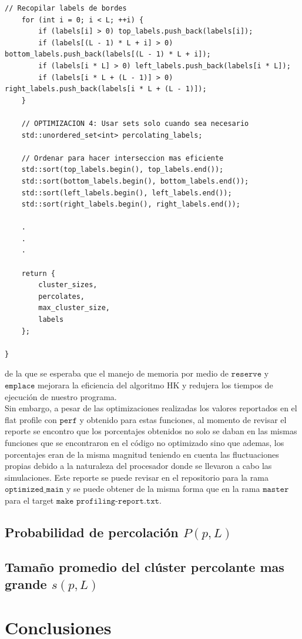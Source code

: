 \documentclass[12pt,a4paper]{article}
\begin{document}
\begin{lstlisting}[style=cpp-style]
    // Recopilar labels de bordes
    for (int i = 0; i < L; ++i) {
        if (labels[i] > 0) top_labels.push_back(labels[i]);
        if (labels[(L - 1) * L + i] > 0) bottom_labels.push_back(labels[(L - 1) * L + i]);
        if (labels[i * L] > 0) left_labels.push_back(labels[i * L]);
        if (labels[i * L + (L - 1)] > 0) right_labels.push_back(labels[i * L + (L - 1)]);
    }

    // OPTIMIZACION 4: Usar sets solo cuando sea necesario
    std::unordered_set<int> percolating_labels;
    
    // Ordenar para hacer interseccion mas eficiente
    std::sort(top_labels.begin(), top_labels.end());
    std::sort(bottom_labels.begin(), bottom_labels.end());
    std::sort(left_labels.begin(), left_labels.end());
    std::sort(right_labels.begin(), right_labels.end());

    .
    .
    .

    return {
        cluster_sizes,
        percolates,
        max_cluster_size,
        labels
    };
    
}
\end{lstlisting}

de la que se esperaba que el manejo de memoria por medio de $\texttt{reserve}$ y $\texttt{emplace}$ mejorara la eficiencia del algoritmo HK y redujera los tiempos de ejecución de nuestro programa.
\\

Sin embargo, a pesar de las optimizaciones realizadas los valores reportados en el flat profile con $\texttt{perf}$ y obtenido para estas funciones, al momento de revisar el reporte se encontro que los porcentajes obtenidos no solo se daban en las mismas funciones que se encontraron en el código no optimizado sino que ademas, los porcentajes eran de la misma magnitud teniendo en cuenta las fluctuaciones propias debido a la naturaleza del procesador donde se llevaron a cabo las simulaciones. Este reporte se puede revisar en el repositorio para la rama $\texttt{optimized\_main}$ y se puede obtener de la misma forma que en la rama $\texttt{master}$ para el target $\texttt{$\texttt{make profiling-report.txt}$}$.

\subsection{Probabilidad de percolación $P(p,L)$}

\subsection{Tamaño promedio del clúster percolante mas grande $s(p,L)$}

\section{Conclusiones}

\clearpage



\end{document}
